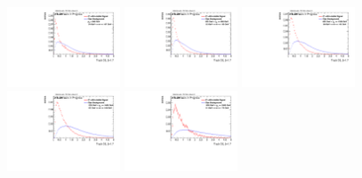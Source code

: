 \begin{figure}
\bigskip
\includegraphics[width=0.3\textwidth]{sascha_input/Appendix/Distributions/higgs/distributions/beta17/h_normal_tj_D2_17_bin1.pdf} \hspace{1mm}
\includegraphics[width=0.3\textwidth]{sascha_input/Appendix/Distributions/higgs/distributions/beta17/h_normal_tj_D2_17_bin2.pdf} \hspace{4mm}
\includegraphics[width=0.3\textwidth]{sascha_input/Appendix/Distributions/higgs/distributions/beta17/h_normal_tj_D2_17_bin3.pdf} 
\bigskip
\includegraphics[width=0.3\textwidth]{sascha_input/Appendix/Distributions/higgs/distributions/beta17/h_normal_tj_D2_17_bin4.pdf} \hspace{4mm}
\includegraphics[width=0.3\textwidth]{sascha_input/Appendix/Distributions/higgs/distributions/beta17/h_normal_tj_D2_17_bin5.pdf} 


\end{figure}
